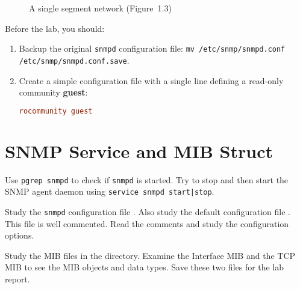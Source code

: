 \documentclass{../UTNetLab}
\begin{document}
\begin{center}
\begin{minipage}{0.48\textwidth}
\begin{flushright}
\begin{figure}[H]
                    \caption{A single segment network (Figure~1.3)}\label{fig:1.3}
                \end{figure}
            \end{flushright}
        \end{minipage}
    \end{center}

    Before the lab, you should:
    \begin{enumerate}
        \item Backup the original \lstinline{snmpd} configuration file:
        \lstinline{mv /etc/snmp/snmpd.conf /etc/snmp/snmpd.conf.save}.
        \item Create a simple configuration file  with a single line defining a read-only community \textbf{guest}:
        \begin{lstlisting}[language={conf}, emph={guest}]
rocommunity guest
        \end{lstlisting}
    \end{enumerate}

\section{SNMP Service and MIB Struct}
    Use \lstinline{pgrep snmpd} to check if \lstinline{snmpd} is started. Try to stop and then start the SNMP agent daemon using \lstinline{service snmpd start|stop}.

    Study the \lstinline{snmpd} configuration file . Also study the default configuration file . This file is well commented. Read the comments and study the configuration options.

    Study the MIB files in the  directory. Examine the Interface MIB  and the TCP MIB  to see the MIB objects and data types. Save these two files for the lab report.
\end{document}
